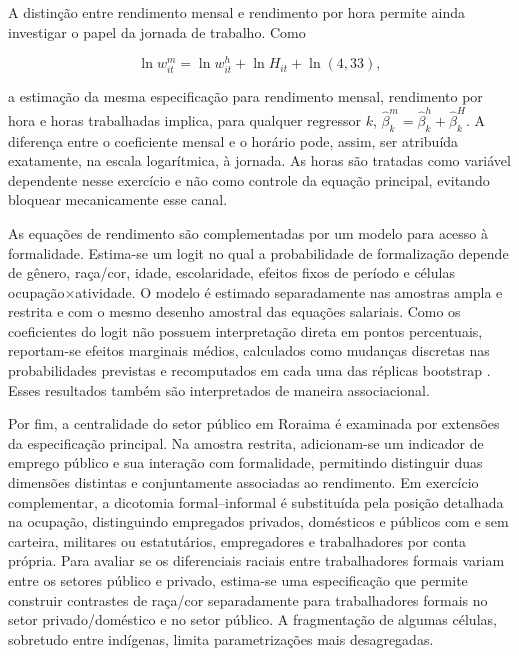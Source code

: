 \documentclass[12pt,a4paper]{article}
\begin{document}
A distinção entre rendimento mensal e rendimento por hora permite ainda
investigar o papel da jornada de trabalho. Como

\begin{equation}
    \ln w^m_{it}
    =
    \ln w^h_{it}
    +
    \ln H_{it}
    +
    \ln(4{,}33),
    \label{eq:identidade_jornada}
\end{equation}

\noindent
a estimação da mesma especificação para rendimento mensal, rendimento por hora
e horas trabalhadas implica, para qualquer regressor $k$,
$\widehat{\beta}^m_k=\widehat{\beta}^h_k+\widehat{\beta}^H_k$. A diferença entre
o coeficiente mensal e o horário pode, assim, ser atribuída exatamente, na
escala logarítmica, à jornada. As horas são tratadas como variável dependente
nesse exercício e não como controle da equação principal, evitando bloquear
mecanicamente esse canal.

As equações de rendimento são complementadas por um modelo para acesso à
formalidade. Estima-se um logit no qual a probabilidade de formalização depende
de gênero, raça/cor, idade, escolaridade, efeitos fixos de período e células
ocupação$\times$atividade. O modelo é estimado separadamente nas amostras ampla
e restrita e com o mesmo desenho amostral das equações salariais. Como os
coeficientes do logit não possuem interpretação direta em pontos percentuais,
reportam-se efeitos marginais médios, calculados como mudanças discretas nas
probabilidades previstas e recomputados em cada uma das réplicas bootstrap
\citep{hanmer2013behind}. Esses resultados também são interpretados de maneira
associacional.

Por fim, a centralidade do setor público em Roraima é examinada por extensões
da especificação principal. Na amostra restrita, adicionam-se um indicador de
emprego público e sua interação com formalidade, permitindo distinguir duas
dimensões distintas e conjuntamente associadas ao rendimento. Em exercício
complementar, a dicotomia formal--informal é substituída pela posição detalhada
na ocupação, distinguindo empregados privados, domésticos e públicos com e sem
carteira, militares ou estatutários, empregadores e trabalhadores por conta
própria. Para avaliar se os diferenciais raciais entre trabalhadores formais variam
entre os setores público e privado, estima-se uma especificação que permite
construir contrastes de raça/cor separadamente para trabalhadores formais no
setor privado/doméstico e no setor público. A fragmentação de algumas células, 
sobretudo entre indígenas, limita parametrizações mais desagregadas.
\end{document}
